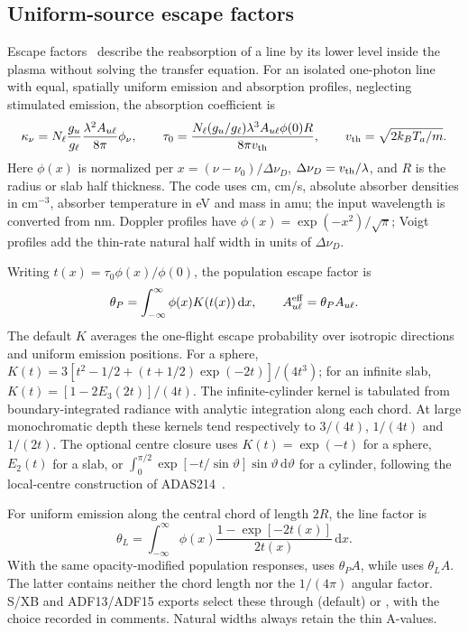 \documentclass[11pt,a4paper]{article}
\newcommand{\code}[1]{\texttt{\detokenize{#1}}}
\newcommand{\dd}{\mathrm{d}}
\numberwithin{equation}{section}
\begin{document}
\subsection{Uniform-source escape factors}\label{sec:opacity}

Escape factors~\cite{irons,behringer} describe the reabsorption of a line by
its lower level inside the plasma without solving the transfer equation.
For an isolated one-photon line with equal, spatially uniform emission and
absorption profiles, neglecting stimulated emission, the absorption coefficient is
\begin{equation}
 \kappa_\nu=N_\ell\frac{g_u}{g_\ell}\frac{\lambda^2 A_{u\ell}}{8\pi}
 \phi_\nu,\qquad
 \tau_0=\frac{N_\ell(g_u/g_\ell)\lambda^3 A_{u\ell}\phi(0)R}{8\pi v_{\rm th}},
 \qquad v_{\rm th}=\sqrt{2k_BT_a/m}.
\end{equation}
Here $\phi(x)$ is normalized per $x=(\nu-\nu_0)/\Delta\nu_D$,
$\Delta\nu_D=v_{\rm th}/\lambda$, and $R$ is the radius or slab half thickness.
The code uses cm, cm/s, absolute absorber densities in cm$^{-3}$, absorber
temperature in eV and mass in amu; the input wavelength is converted from nm.
Doppler profiles have $\phi(x)=\exp(-x^2)/\sqrt\pi$; Voigt profiles add the
thin-rate natural half width in units of $\Delta\nu_D$.

Writing $t(x)=\tau_0\phi(x)/\phi(0)$, the population escape factor is
\begin{equation}
 \theta_P=\int_{-\infty}^{\infty}\phi(x)K(t(x))\,\dd x,
 \qquad A^{\rm eff}_{u\ell}=\theta_P A_{u\ell}.
\end{equation}
The default $K$ averages the one-flight escape probability over isotropic
directions and uniform emission positions. For a sphere,
$K(t)=3[t^2-1/2+(t+1/2)\exp(-2t)]/(4t^3)$; for an infinite slab,
$K(t)=[1-2E_3(2t)]/(4t)$. The infinite-cylinder kernel is tabulated from
boundary-integrated radiance with analytic integration along each chord.
At large monochromatic depth these kernels tend respectively to
$3/(4t)$, $1/(4t)$ and $1/(2t)$.
The optional centre closure uses $K(t)=\exp(-t)$ for a sphere,
$E_2(t)$ for a slab, or
$\int_0^{\pi/2}\exp[-t/\sin\vartheta]\sin\vartheta\,\dd\vartheta$
for a cylinder, following the local-centre construction of
ADAS214~\cite{adas214}.

For uniform emission along the central chord of length $2R$, the line factor is
\begin{equation}
 \theta_L=\int_{-\infty}^{\infty}\phi(x)
 \frac{1-\exp[-2t(x)]}{2t(x)}\,\dd x.
\end{equation}
With the same opacity-modified population responses, \code{pecs} uses
$\theta_P A$, while \code{pecs_los} uses $\theta_L A$. The latter contains
neither the chord length nor the $1/(4\pi)$ angular factor. S/XB and
ADF13/ADF15 exports select these through \code{emission='net'} (default)
or \code{emission='los'}, with the choice recorded in comments.
Natural widths always retain the thin A-values.
\end{document}
